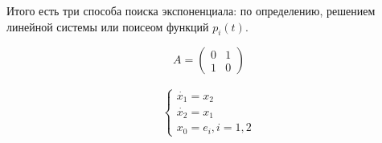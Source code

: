 Итого есть три способа поиска экспоненциала: по определению, решением линейной системы или поисеом функций $p_i(t)$.

\begin{exmp}
    \begin{equation*}
        A = \left( \begin{matrix}
            0 & 1 \\
            1 & 0
        \end{matrix} \right)
    \end{equation*}

    \begin{gather*}
        \begin{cases}
            \dot{x_1} = x_2 \\
            \dot{x_2} = x_1 \\
            x_0 = e_i, i = 1, 2
        \end{cases}
    \end{gather*}


\end{exmp}
